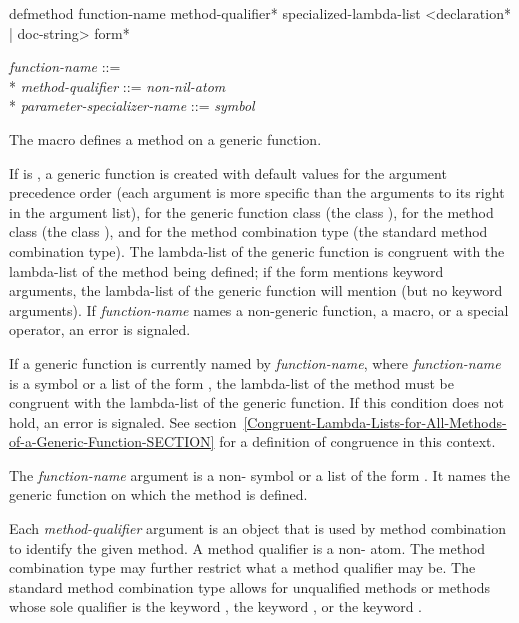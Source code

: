 \begin{defmac}
defmethod function-name {method-qualifier}*
          specialized-lambda-list
          <{declaration}* | doc-string> {form}*

\begin{tabbing}
\emph{function-name} ::=  \\*
\emph{method-qualifier} ::= \emph{non-nil-atom} \\*
\emph{parameter-specializer-name} ::= \emph{symbol} {\Mor} 
\end{tabbing}
The macro  defines a method on a generic function.

If  is , a generic
function is created with default values for the argument precedence
order (each argument is more specific than the arguments to its right
in the argument list), for the generic function class (the class 
), for the method class (the class 
), and for the method combination type (the standard
method combination type).  The lambda-list of the generic function is
congruent with the lambda-list of the method being defined; if the
 form mentions keyword arguments, the lambda-list of
the generic function will mention  (but no keyword
arguments).  If \emph{function-name} names a non-generic
function, a macro, or a special operator, an error is signaled.

If a generic function is currently named by \emph{function-name}, where
\emph{function-name} is a symbol or a list of the form , the lambda-list of the 
method must be congruent with the lambda-list of the generic function.
If this condition does not hold, an error is signaled.  See
section~\ref{Congruent-Lambda-Lists-for-All-Methods-of-a-Generic-Function-SECTION}
for a definition of congruence in this context.

The \emph{function-name} argument is a non- symbol or a
list of the form .  It names the generic
function on which the method is defined.

Each \emph{method-qualifier} argument is an object that is used by
method combination to identify the given method.  A method qualifier
is a non- atom. The method combination type may further
restrict what a method qualifier may be.  The standard method
combination type allows for unqualified methods or methods whose sole
qualifier is the keyword , the keyword 
, or the keyword .


\end{defmac}
